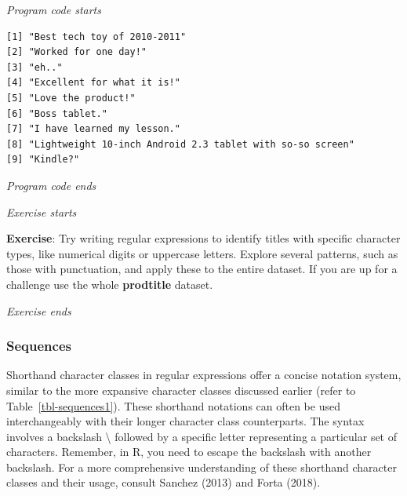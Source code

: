 \emph{Program code starts}

\begin{Shaded}
\begin{Highlighting}[]
\NormalTok{(} \NormalTok{)}
\end{Highlighting}
\end{Shaded}

\begin{verbatim}
[1] "Best tech toy of 2010-2011"                              
[2] "Worked for one day!"                                     
[3] "eh.."                                                    
[4] "Excellent for what it is!"                               
[5] "Love the product!"                                       
[6] "Boss tablet."                                            
[7] "I have learned my lesson."                               
[8] "Lightweight 10-inch Android 2.3 tablet with so-so screen"
[9] "Kindle?"                                                 
\end{verbatim}

\emph{Program code ends}

\emph{Exercise starts}

\textbf{Exercise}: Try writing regular expressions to identify titles
with specific character types, like numerical digits or uppercase letters.
Explore several patterns, such as those with punctuation, and apply
these to the entire dataset. If you are up for a challenge use the whole
\textbf{prodtitle} dataset.

\emph{Exercise ends}

\subsubsection{Sequences}\label{sequences}

Shorthand character classes in regular expressions offer a concise
notation system, similar to the more expansive character classes
discussed earlier (refer to Table~\ref{tbl-sequences1}). These shorthand
notations can often be used interchangeably with their longer character
class counterparts. The syntax involves a backslash \textbackslash{}
followed by a specific letter representing a particular set of
characters. Remember, in R, you need to escape the backslash with
another backslash. For a more comprehensive understanding of these
shorthand character classes and their usage, consult Sanchez (2013) and 
Forta (2018).

